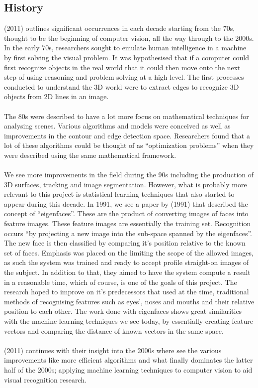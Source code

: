 \documentclass{article}
\begin{document}
 \subsection{History}
 \citeauthor{SzeliskiRichard2011CV:A} (2011) outlines significant occurrences in each decade starting from the 70s, thought to be the beginning of 
 computer vision, all the way through to the 2000s. In the early 70s, researchers sought to emulate human intelligence 
 in a machine by first solving the visual problem. It was hypothesised that if a computer could first recognize objects 
 in the real world that it could then move onto the next step of using reasoning and problem solving at a high level. 
 The first processes conducted to understand the 3D world were to extract edges to recognize 3D objects from 2D lines in
  an image.
  \\
  \\
  The 80s were described to have a lot more focus on mathematical techniques for analysing scenes. Various algorithms 
  and models were conceived as well as improvements in the contour and edge detection space. Researchers found that a 
  lot of these algorithms could be thought of as “optimization problems” when they were described using the same 
  mathematical framework.
  \\
  \\
  We see more improvements in the field during the 90s including the production of 3D surfaces, tracking and image 
  segmentation. However, what is probably more relevant to this project is statistical learning techniques that also 
  started to appear during this decade. In 1991, we see a paper by \citeauthor{turk1991face} (1991) that described
   the concept of “eigenfaces”. These are the product of converting images of faces into feature images. These feature 
   images are essentially the training set. Recognition occurs “by projecting a new image into the sub-space spanned by 
   the eigenfaces”. The new face is then classified by comparing it’s position relative to the known set of faces. 
   Emphasis was placed on the limiting the scope of the allowed images, as such the system was trained and ready to 
   accept profile straight-on images of the subject. In addition to that, they aimed to have the system compute a result
    in a reasonable time, which of course, is one of the goals of this project. The research hoped to improve on it’s 
    predecessors that used at the time, traditional methods of recognising features such as eyes’, noses and mouths and 
    their relative position to each other. The work done with eigenfaces shows great similarities with the machine 
    learning techniques we see today, by essentially creating feature vectors and comparing the distance of known 
    vectors in the same space.
\\
\\
\citeauthor{SzeliskiRichard2011CV:A} (2011) continues with their insight into the 2000s where see the various improvements like more efficient 
algorithms and what finally dominates the latter half of the 2000s; applying machine learning techniques to computer
    vision to aid visual recognition research.
\end{document}
